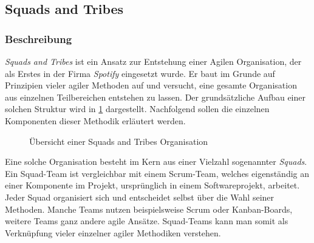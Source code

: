 \subsection{Squads and Tribes}

\subsubsection{Beschreibung}

\textit{Squads and Tribes} ist ein Ansatz zur Entstehung einer Agilen Organisation, der als Erstes in der Firma \textit{Spotify} eingesetzt wurde. Er baut im Grunde auf Prinzipien vieler agiler Methoden auf und versucht, eine gesamte Organisation aus einzelnen Teilbereichen entstehen zu lassen. Der grundsätzliche Aufbau einer solchen Struktur wird in \ref{fig:squadstribes} dargestellt. Nachfolgend sollen die einzelnen Komponenten dieser Methodik erläutert werden. 

\begin{figure}[H]
	\centering
	\caption[Übersicht einer Squads and Tribes Organisation]{Übersicht einer Squads and Tribes Organisation \protect \cite[S. 1]{kniberg_scaling_2012}}
	\label{fig:squadstribes}
\end{figure}

Eine solche Organisation besteht im Kern aus einer Vielzahl sogenannter \textit{Squads}. Ein Squad-Team ist vergleichbar mit einem Scrum-Team, welches eigenständig an einer Komponente im Projekt, ursprünglich in einem Softwareprojekt, arbeitet. Jeder Squad organisiert sich und entscheidet selbst über die Wahl seiner Methoden. Manche Teams nutzen beispielsweise Scrum oder Kanban-Boards, weitere Teams ganz andere agile Ansätze. Squad-Teams kann man somit als Verknüpfung vieler einzelner agiler Methodiken verstehen. \cite[S. 2]{kniberg_scaling_2012}

